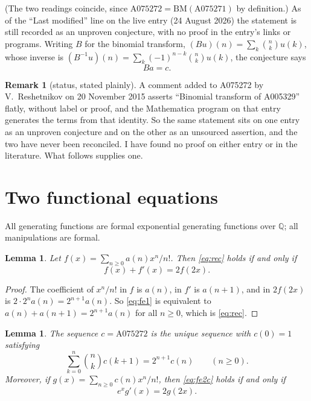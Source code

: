 \documentclass[11pt,a4paper]{article}
\theoremstyle{plain}
\newtheorem{lemma}[theorem]{Lemma}
\theoremstyle{definition}
\newtheorem*{remark}{Remark}
\begin{document}
(The two readings coincide, since $\mathrm{A075272}=\mathrm{BM}(\mathrm{A075271})$ by
definition.) As of the ``Last modified'' line on the live entry (24 August 2026) the
statement is still recorded as an unproven conjecture, with no proof in the entry's links
or programs. Writing $B$ for the binomial transform, $(Bu)(n)=\sum_{k}\binom{n}{k}u(k)$,
whose inverse is $(B^{-1}u)(n)=\sum_{k}(-1)^{n-k}\binom{n}{k}u(k)$, the conjecture says
\begin{equation}\label{eq:conj}
  Ba=c.
\end{equation}

\begin{remark}[status, stated plainly]
A comment added to A075272 by V.~Reshetnikov on 20 November 2015 asserts ``Binomial
transform of A005329'' flatly, without label or proof, and the Mathematica program on that
entry generates the terms from that identity. So the same statement sits on one entry as an
unproven conjecture and on the other as an unsourced assertion, and the two have never been
reconciled. I have found no proof on either entry or in the literature. What follows
supplies one.
\end{remark}

\section{Two functional equations}

All generating functions are formal exponential generating functions over $\mathbb{Q}$; all
manipulations are formal.

\begin{lemma}\label{lem:f}
Let $f(x)=\sum_{n\ge0}a(n)x^{n}/n!$. Then \eqref{eq:rec} holds if and only if
\begin{equation}\label{eq:fe1}
  f(x)+f'(x)=2f(2x).
\end{equation}
\end{lemma}

\begin{proof}
The coefficient of $x^{n}/n!$ in $f$ is $a(n)$, in $f'$ is $a(n+1)$, and in $2f(2x)$ is
$2\cdot2^{n}a(n)=2^{n+1}a(n)$. So \eqref{eq:fe1} is equivalent to
$a(n)+a(n+1)=2^{n+1}a(n)$ for all $n\ge0$, which is \eqref{eq:rec}.
\end{proof}

\begin{lemma}\label{lem:g}
The sequence $c=\mathrm{A075272}$ is the unique sequence with $c(0)=1$ satisfying
\begin{equation}\label{eq:fe2c}
  \sum_{k=0}^{n}\binom{n}{k}c(k+1)=2^{n+1}c(n)\qquad(n\ge0).
\end{equation}
Moreover, if $g(x)=\sum_{n\ge0}c(n)x^{n}/n!$, then \eqref{eq:fe2c} holds if and only if
\begin{equation}\label{eq:fe2}
  e^{x}g'(x)=2g(2x).
\end{equation}
\end{lemma}
\end{document}
